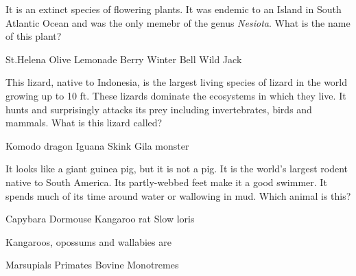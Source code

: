 


\begin{center}
\end{center}

\begin{questions}

\question It is an extinct species of flowering plants. It was endemic to an Island in South Atlantic Ocean and was the only memebr of the genus \emph{Nesiota}. What is the name of this plant?

\begin{randomizeoneparchoices}
    \CorrectChoice St.Helena Olive
    \choice Lemonade Berry
    \choice Winter Bell
    \choice Wild Jack
\end{randomizeoneparchoices}

\question This lizard, native to Indonesia, is the largest living species of lizard in the world growing up to 10 ft. These lizards dominate the ecosystems in which they live. It hunts and surprisingly attacks its prey including invertebrates, birds and mammals. What is this lizard called?

\begin{randomizeoneparchoices}
    \CorrectChoice Komodo dragon
    \choice Iguana
    \choice Skink
    \choice Gila monster
\end{randomizeoneparchoices}

\question It looks like a giant guinea pig, but it is not a pig. It is the world's largest rodent native to South America. Its partly-webbed feet make it a good swimmer. It spends much of its time around water or wallowing in mud. Which animal is this?

\begin{randomizeoneparchoices}
    \CorrectChoice Capybara
    \choice Dormouse
    \choice Kangaroo rat
    \choice Slow loris
\end{randomizeoneparchoices}

\question Kangaroos, opossums and wallabies are \fillin

\begin{randomizeoneparchoices}
    \CorrectChoice Marsupials
    \choice Primates
    \choice Bovine
    \choice Monotremes
\end{randomizeoneparchoices}


\end{questions}
